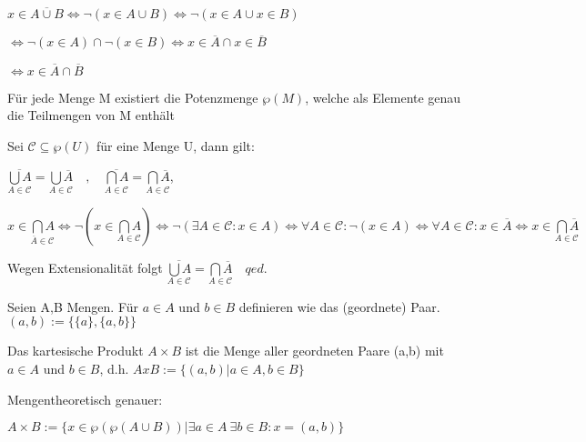\documentclass{../../meta/tudscript}
\begin{document}
\(x \in \overline{A \cup B} \iff \neg(x \in A \cup B) \iff \neg(x \in A \cup x \in B)\)

\(\iff \neg(x \in A) \cap \neg (x \in B) \iff x \in \overline{A} \cap x \in \overline{B}\)

\(\iff x \in \overline{A} \cap \overline{B}\)


Für jede Menge M existiert die Potenzmenge \(\wp(M)\), welche als
Elemente genau die Teilmengen von M enthält


Sei \(\mathscr{C} \subseteq \wp(U)\) für eine Menge U, dann gilt:

\(\overline{\underset{A\in \mathscr{C}}{\bigcup A}} = \underset{A \in \mathscr{C}}{\bigcup \overline{A}} \quad,\quad \overline{\underset{A\in \mathscr{C}}{\bigcap A}} = \underset{A \in \mathscr{C}}{\bigcap \overline{A}}\),


\({x \in \underset{\overline{A}\in \mathscr{C}}{\bigcap A}} \iff {\neg \left(x \in \underset{A\in \mathscr{C}}{\bigcap A}\right)}  \iff {\neg \left(\exists A \in \mathscr{C}: x \in A\right)} \iff {\forall A \in \mathscr{C}: \neg(x \in A)} \iff \forall A \in \mathscr{C}: x \in \overline{A} \iff x \in \underset{A\in \mathscr{C}}{\bigcap \overline{A}}\)

Wegen Extensionalität folgt
\(\overline{\underset{A\in \mathscr{C}}{\bigcup A}} = \underset{A\in \mathscr{C}}{\bigcap \overline{A}} \quad qed.\)


Seien A,B Mengen. Für \(a \in A\) und \(b \in B\) definieren wie das
(geordnete) Paar. \((a, b) := \{\{a\}, \{a,b\}\}\)

Das kartesische Produkt \(A \times B\) ist die Menge aller geordneten
Paare (a,b) mit \(a \in A\) und \(b \in B\), d.h.
\(A x B:=\{(a,b) \vert a \in A, b \in B\}\)

Mengentheoretisch genauer:

\(A \times B:=\{x \in \wp(\wp(A \cup B)) \vert \exists a \in A \>\exists b \in B: x=(a,b)\}\)
\end{document}
